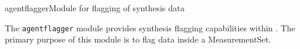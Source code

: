 
\begin{ahmodule}{agentflagger}{Module for flagging of synthesis data}

\begin{ahdescription}

The {\tt agentflagger} module provides synthesis flagging capabilities
within \aipspp. The primary purpose of this module is to flag data
inside a MeasurementSet.
\end{ahdescription}



\end{ahmodule}
